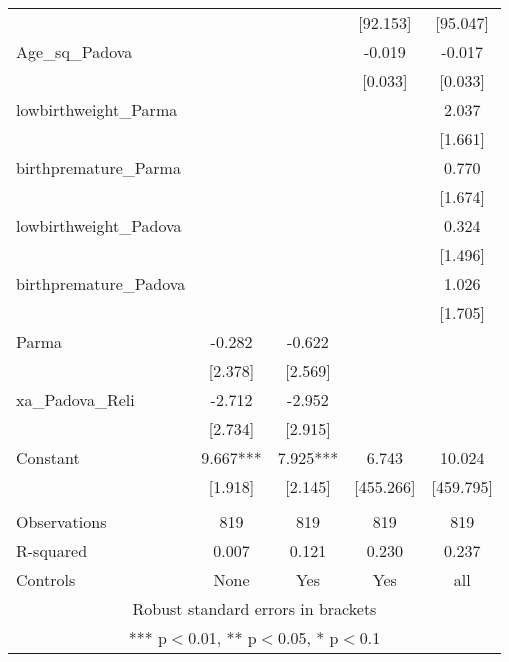 \documentclass[]{article}
\begin{document}
\begin{tabular}{lcccc}
 &  &  & [92.153] & [95.047] \\
Age\_sq\_Padova &  &  & -0.019 & -0.017 \\
 &  &  & [0.033] & [0.033] \\
lowbirthweight\_Parma &  &  &  & 2.037 \\
 &  &  &  & [1.661] \\
birthpremature\_Parma &  &  &  & 0.770 \\
 &  &  &  & [1.674] \\
lowbirthweight\_Padova &  &  &  & 0.324 \\
 &  &  &  & [1.496] \\
birthpremature\_Padova &  &  &  & 1.026 \\
 &  &  &  & [1.705] \\
Parma & -0.282 & -0.622 &  &  \\
 & [2.378] & [2.569] &  &  \\
xa\_Padova\_Reli & -2.712 & -2.952 &  &  \\
 & [2.734] & [2.915] &  &  \\
Constant & 9.667*** & 7.925*** & 6.743 & 10.024 \\
 & [1.918] & [2.145] & [455.266] & [459.795] \\
 &  &  &  &  \\
Observations & 819 & 819 & 819 & 819 \\
R-squared & 0.007 & 0.121 & 0.230 & 0.237 \\
 Controls & None & Yes & Yes & all \\ \hline
\multicolumn{5}{c}{ Robust standard errors in brackets} \\
\multicolumn{5}{c}{ *** p$<$0.01, ** p$<$0.05, * p$<$0.1} \\
\end{tabular}
\end{document}

